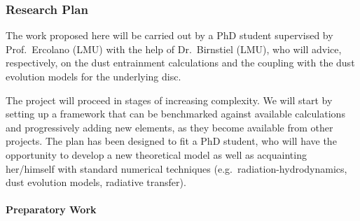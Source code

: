 \documentclass[10pt,fleqn,twoside]{article}
\begin{document}
\subsubsection{Research Plan} 

The work proposed here will be carried out by a PhD student supervised by
Prof.\ Ercolano (LMU) with the help of Dr.\ Birnstiel (LMU), who will
advice, respectively, on the dust entrainment calculations and the 
coupling with the dust evolution models for the underlying disc. 

The project will proceed in stages of increasing complexity. We will start
by setting up a framework that can be benchmarked against available
calculations and progressively adding new elements, as they become
available from other projects. The plan has been designed to fit a
PhD student, who will have the opportunity to develop a new theoretical
model as well as acquainting her/himself with standard numerical
techniques (e.g.\ radiation-hydrodynamics, dust evolution models,
radiative transfer). 


\paragraph{Preparatory Work}
\end{document}
